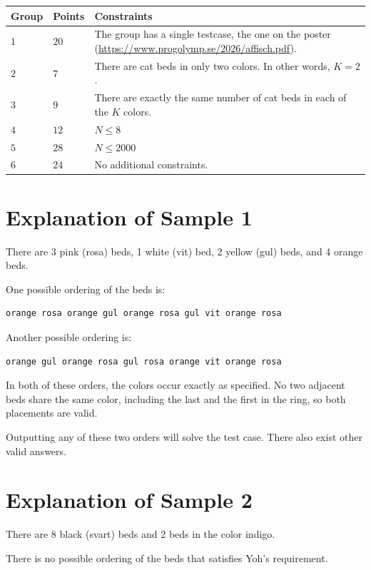 \noindent
\begin{tabular}{| l | l | p{12cm} |}
  \hline
  \textbf{Group} & \textbf{Points} & \textbf{Constraints} \\ \hline
  $1$    & $20$       & The group has a single testcase, the one on the poster (\url{https://www.progolymp.se/2026/affisch.pdf}). \\ \hline
  $2$    & $7$        & There are cat beds in only two colors. In other words, $K = 2$. \\ \hline
  $3$    & $9$        & There are exactly the same number of cat beds in each of the $K$ colors. \\ \hline
  $4$    & $12$       & $N \le 8$ \\ \hline
  $5$    & $28$       & $N \le 2000$ \\ \hline
  $6$    & $24$       & No additional constraints. \\ \hline
\end{tabular}

\section*{Explanation of Sample 1}
There are 3 pink (rosa) beds, 1 white (vit) bed, 2 yellow (gul) beds, and 4 orange beds.

One possible ordering of the beds is:
\begin{verbatim}
orange rosa orange gul orange rosa gul vit orange rosa
\end{verbatim}

Another possible ordering is:
\begin{verbatim}
orange gul orange rosa gul rosa orange vit orange rosa
\end{verbatim}

In both of these orders, the colors occur exactly as specified.
No two adjacent beds share the same color, including the last and the first in the ring, so both placements are valid.

Outputting any of these two orders will solve the test case.
There also exist other valid answers.

\section*{Explanation of Sample 2}
There are 8 black (svart) beds and 2 beds in the color indigo.

There is no possible ordering of the beds that satisfies Yoh's requirement.
